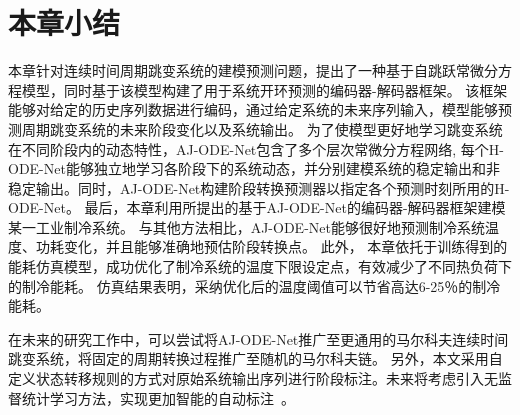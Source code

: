\section{本章小结}
\label{sec:4_conclusion}
本章针对连续时间周期跳变系统的建模预测问题，提出了一种基于自跳跃常微分方程模型，同时基于该模型构建了用于系统开环预测的编码器-解码器框架。
该框架能够对给定的历史序列数据进行编码，通过给定系统的未来序列输入，模型能够预测周期跳变系统的未来阶段变化以及系统输出。
为了使模型更好地学习跳变系统在不同阶段内的动态特性，AJ-ODE-Net包含了多个层次常微分方程网络, 每个H-ODE-Net能够独立地学习各阶段下的系统动态，并分别建模系统的稳定输出和非稳定输出。同时，AJ-ODE-Net构建阶段转换预测器以指定各个预测时刻所用的H-ODE-Net。
最后，本章利用所提出的基于AJ-ODE-Net的编码器-解码器框架建模某一工业制冷系统。
与其他方法相比，AJ-ODE-Net能够很好地预测制冷系统温度、功耗变化，并且能够准确地预估阶段转换点。
此外，
本章依托于训练得到的能耗仿真模型，成功优化了制冷系统的温度下限设定点，有效减少了不同热负荷下的制冷能耗。
仿真结果表明，采纳优化后的温度阈值可以节省高达6-25％的制冷能耗。

在未来的研究工作中，可以尝试将AJ-ODE-Net推广至更通用的马尔科夫连续时间跳变系统，将固定的周期转换过程推广至随机的马尔科夫链。
另外，本文采用自定义状态转移规则的方式对原始系统输出序列进行阶段标注。未来将考虑引入无监督统计学习方法，实现更加智能的自动标注~\cite{10.1145/3097983.3098060}。





